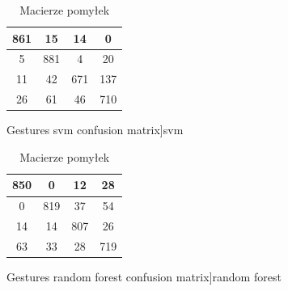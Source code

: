 \documentclass{classrep}
\begin{document}
{{{                \begin{table}[!htbp]
                    \begin{minipage}{.48\textwidth}
                        \centering
                        \begin{tabular}{|c|c|c|c|}
                            \hline
                            861 & 15 & 14 & 0 \\ \hline
                            5 & 881 & 4 & 20 \\ \hline
                            11 & 42 & 671 & 137 \\ \hline
                            26 & 61 & 46 & 710 \\ \hline
                        \end{tabular}
                        \caption
                        [Gestures svm confusion matrix]{svm}
                        \label{Gestures_svm_confusion_matrix}
                    \end{minipage}
                    \hfill
                    \begin{minipage}{.48\textwidth}
                        \centering
                        \begin{tabular}{|c|c|c|c|}
                            \hline
                            850 & 0 & 12 & 28 \\ \hline
                            0 & 819 & 37 & 54 \\ \hline
                            14 & 14 & 807 & 26 \\ \hline
                            63 & 33 & 28 & 719 \\ \hline
                        \end{tabular}
                        \caption
                        [Gestures random forest confusion matrix]{random forest}
                        \label{Gestures_random_forest_confusion_matrix}
                    \end{minipage}
                    \caption{Macierze pomyłek}
                \end{table}
                \FloatBarrier

}}}
\end{document}
